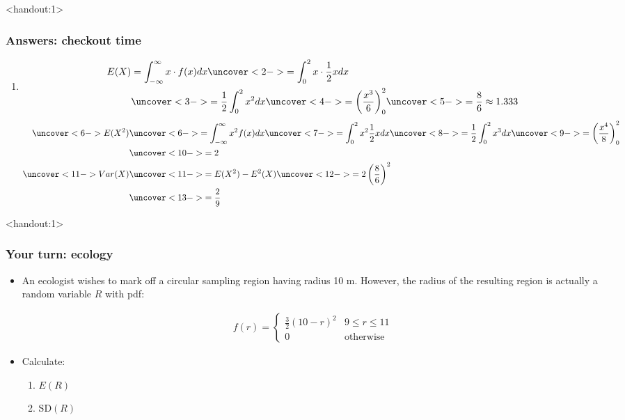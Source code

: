 \documentclass[handout]{beamer}\usepackage{graphicx, color}
\newcommand{\answers}{1}
\numberwithin{equation}{section}
\begin{document}
\begin{frame}<handout:\answers>
\frametitle{Answers: checkout time} \small
\begin{enumerate}[1. ]
\item 
\begin{align*}
E(X) &= \int_{-\infty}^\infty x \cdot f(x) dx \uncover<2->{= \int_0^2 x \cdot \frac{1}{2} x dx} \\
&\uncover<3->{= \frac{1}{2} \int_0^2 x^2 dx} \uncover<4->{= \left ( \frac{x^3}{6}\right )_0^2} \uncover<5->{ = \frac{8}{6} \approx 1.333}
\end{align*}
\begin{align*}
\uncover<6->{E(X^2)} & \uncover<6->{= \int_{-\infty}^\infty x^2 f(x) dx} \uncover<7->{=\int_0^2 x^2 \frac{1}{2} x dx} \uncover<8->{ = \frac{1}{2} \int_{0}^2 x^3 dx} \uncover<9->{ = \left ( \frac{x^4}{8} \right )_0^2 } \\ 
&\uncover<10->{=2} \\
\uncover<11->{Var(X)} & \uncover<11->{= E(X^2) - E^2(X)} \uncover<12->{= 2 \left ( \frac{8}{6} \right ) ^2 } \\
& \uncover<13->{= \frac{2}{9}}
\end{align*}
\end{enumerate}
\end{frame}


\begin{frame}<handout:\answers>
\frametitle{Your turn: ecology}
\begin{itemize}
\item An ecologist wishes to mark off a circular sampling region having radius 10 m. However, the radius of the resulting region is actually a random variable $R$ with pdf:
\begin{center}
\begin{align*}
f(r) = \begin{cases}
\frac{3}{2} (10 - r)^2 & 9 \le r \le 11 \\
0 & \text{otherwise}
\end{cases}
\end{align*}
\end{center}
\item Calculate:
\begin{enumerate}[1. ]
\item $E(R)$
\item SD$(R)$
\end{enumerate}
\end{itemize}
\end{frame}
\end{document}
